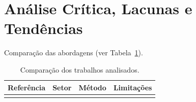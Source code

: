 \section{Análise Crítica, Lacunas e Tendências}
Comparação das abordagens (ver Tabela~\ref{tab:comparacao}).

\begin{table}
\caption{Comparação dos trabalhos analisados.}\label{tab:comparacao}
\begin{tabular}{|l|l|l|l|}
\hline
Referência & Setor & Método & Limitações\\
\hline
 & & & \\
\hline
\end{tabular}
\end{table}
